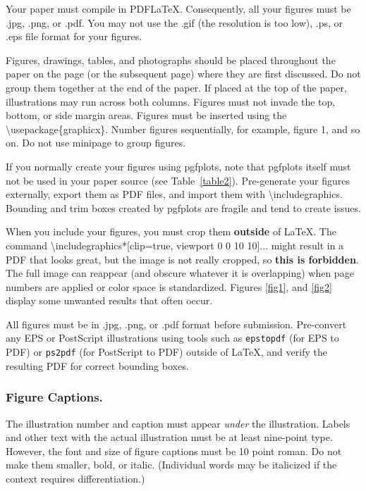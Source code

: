 

Your paper must compile in PDF\LaTeX{}. Consequently, all your figures must be .jpg, .png, or .pdf. You may not use the .gif (the resolution is too low), .ps, or .eps file format for your figures.

Figures, drawings, tables, and photographs should be placed throughout the paper on the page (or the subsequent page) where they are first discussed. Do not group them together at the end of the paper. If placed at the top of the paper, illustrations may run across both columns. Figures must not invade the top, bottom, or side margin areas. Figures must be inserted using the \textbackslash usepackage\{graphicx\}. Number figures sequentially, for example, figure 1, and so on. Do not use minipage to group figures.

If you normally create your figures using pgfplots, note that pgfplots itself must not be used in your paper source (see Table~\ref{table2}). Pre-generate your figures externally, export them as PDF files, and import them with \textbackslash includegraphics. Bounding and trim boxes created by pgfplots are fragile and tend to create issues.

When you include your figures, you must crop them \textbf{outside} of \LaTeX{}. The command \textbackslash includegraphics*[clip=true, viewport 0 0 10 10]{...} might result in a PDF that looks great, but the image is not really cropped, so \textbf{this is forbidden}. The full image can reappear (and obscure whatever it is overlapping) when page numbers are applied or color space is standardized. Figures \ref{fig1}, and \ref{fig2} display some unwanted results that often occur.

All figures must be in .jpg, .png, or .pdf format before submission. Pre-convert any EPS or PostScript illustrations using tools such as \texttt{epstopdf} (for EPS to PDF) or \texttt{ps2pdf} (for PostScript to PDF) outside of \LaTeX{}, and verify the resulting PDF for correct bounding boxes.

\subsubsection {Figure Captions.}The illustration number and caption must appear \textit{under} the illustration. Labels and other text with the actual illustration must be at least nine-point type. However, the font and size of figure captions must be 10 point roman. Do not make them smaller, bold, or italic. (Individual words may be italicized if the context requires differentiation.)

